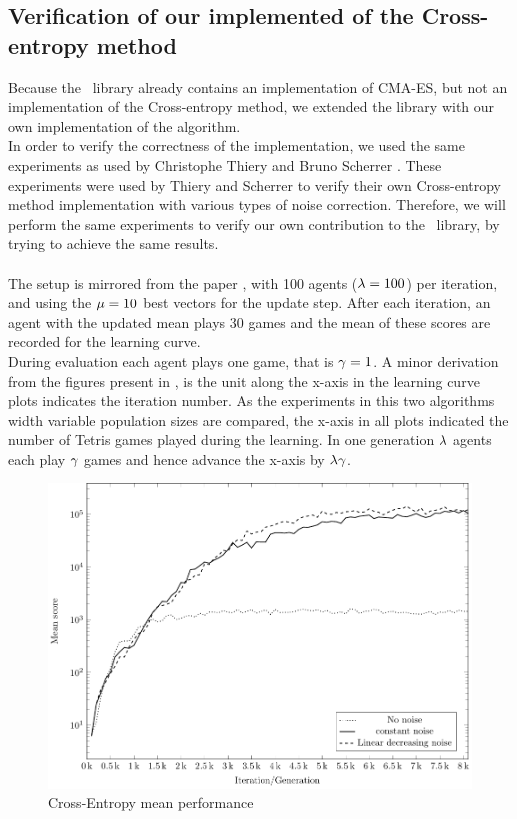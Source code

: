 \subsection{Verification of our implemented of the Cross-entropy method \label{varifyofce}}

Because the \shark\ library already contains an implementation of 
CMA-ES, but not an implementation of the Cross-entropy method, we extended the library
with our own implementation of the algorithm.\\
In order to verify the correctness of the implementation, 
we used the same experiments as used by 
Christophe Thiery and Bruno Scherrer \citep{thiery:09}. 
These experiments were used by Thiery and Scherrer to 
verify their own Cross-entropy method implementation with various types of noise correction. 
Therefore, we will perform the same experiments to verify our 
own contribution to the \shark\  library, by trying to achieve the same results.\\
\\
The setup is mirrored from the paper \citep{thiery:09}, 
with 100 agents ($\lambda = 100$) per iteration,
and using the $\mu = 10$ best vectors
for the update step. After each iteration, 
an agent with the updated mean 
plays 30 games and the mean of these scores are recorded for the
learning curve.\\
During evaluation each agent plays one game, that is $\gamma = 1$.
A minor derivation from the figures present in \citep{thiery:09}, is 
the unit along the x-axis in the learning curve plots indicates 
the iteration number. As the experiments in this two algorithms
width variable population sizes are compared, the x-axis in all plots
indicated the number of Tetris games played during the learning. In one 
generation $\lambda$ agents each play $\gamma$ games and hence
advance the x-axis by $\lambda \gamma$.\\

\begin{figure}[H]
\begin{center}
\includegraphics[scale=0.8]{plots/meansPlot}
\end{center}
\caption{Cross-Entropy mean performance \label{fig:cemean}}
\end{figure}

